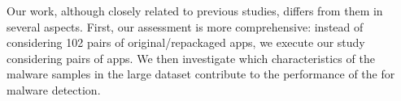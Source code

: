 

Our work, although closely related to previous studies, differs from them in several aspects.  First, our assessment is more comprehensive: instead of considering 102 pairs of original/repackaged apps, we execute our study considering \apps pairs of apps.
We then investigate which characteristics of the malware samples in the large dataset contribute to the performance of the \mas for malware detection.







